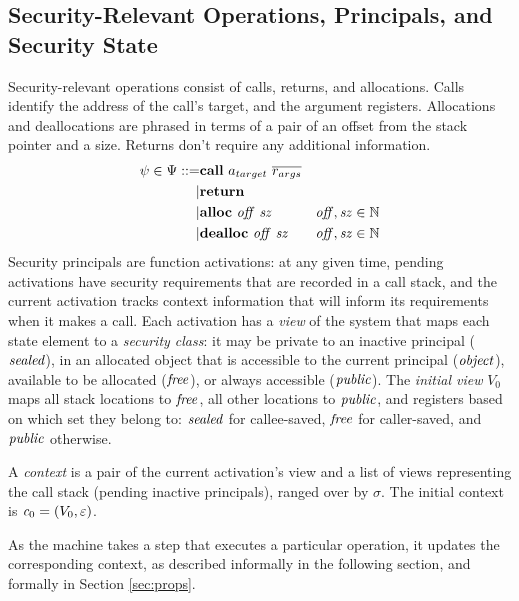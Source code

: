 \documentclass[10pt,conference]{ieeetran}%
\theoremstyle{definition}
\begin{document}
\subsection{Security-Relevant Operations, Principals, and Security State}

Security-relevant operations consist of calls, returns, and allocations.
Calls identify the address of the call's target,
and the argument registers. Allocations and deallocations are phrased in terms of a pair
of an offset from the stack pointer and a size. Returns don't require any additional information.
%
\begin{align*}
  \psi \in \Psi ::= & \mathbf{call} ~ a_{target} ~ \overline{r_{args}} & \\
  | & \mathbf{return} & \\
  | & \mathbf{alloc} ~ \mathit{off ~ sz} & \mathit{off, sz} \in \mathbb{N} \\
  | & \mathbf{dealloc} ~ \mathit{off ~ sz} & \mathit{off, sz} \in \mathbb{N} \\
\end{align*}
%
Security principals are function activations: at any given time, pending activations
have security requirements that are recorded in a call stack, and the current
activation tracks context information that will inform its requirements when
it makes a call. Each activation has a {\it view}
of the system that maps each state element to a {\it security class}:
it may be private to an inactive principal (\(\mathit{sealed}\)),
in an allocated object that is accessible to the current principal (\(\mathit{object}\)),
available to be allocated (\(\mathit{free}\)), or
always accessible (\(\mathit{public}\)). The {\it initial view} \(V_0\) maps all stack locations to \(\mathit{free}\),
all other locations to \(\mathit{public}\), and registers based on which set they
belong to: %
\(\mathit{sealed}\) for callee-saved, \(\mathit{free}\) for caller-saved, and \(\mathit{public}\) otherwise.

A {\it context} is a pair of the current activation's view and 
a list of views representing the call stack (pending inactive
principals), ranged over by \(\sigma\).  
The initial context is \(\mathit{c}_0 = (V_0, \varepsilon)\).

As the machine takes a step that executes a particular operation, it updates the
corresponding context, as described informally in the following section, and formally
in Section \ref{sec:props}.
\end{document}
